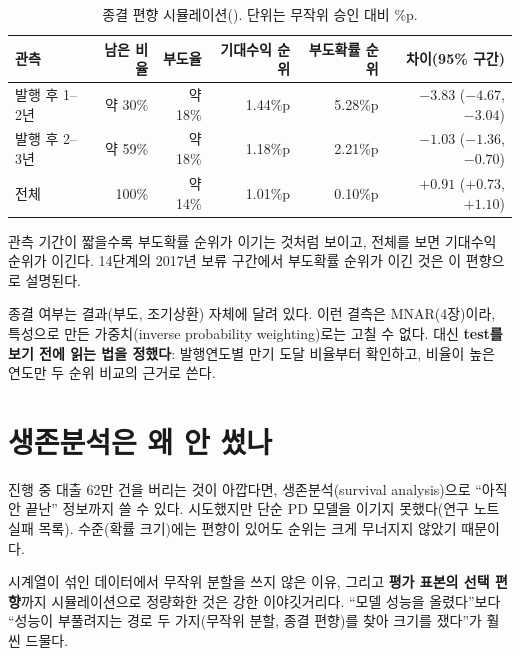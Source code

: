 \begin{table}[H]\centering\small
\begin{tabular}{@{}lrrrrr@{}}\toprule
관측 & 남은 비율 & 부도율 & 기대수익 순위 & 부도확률 순위 & 차이(95\% 구간)\\\midrule
발행 후 1--2년 & 약 30\% & 약 18\% & 1.44\%p & 5.28\%p & $-3.83$ ($-4.67$, $-3.04$)\\
발행 후 2--3년 & 약 59\% & 약 18\% & 1.18\%p & 2.21\%p & $-1.03$ ($-1.36$, $-0.70$)\\
전체 & 100\% & 약 14\% & 1.01\%p & 0.10\%p & $+0.91$ ($+0.73$, $+1.10$)\\\bottomrule
\end{tabular}
\caption{종결 편향 시뮬레이션(). 단위는 무작위 승인 대비 \%p.}
\end{table}

\begin{keybox}[결과 C23과 C6 정정]
관측 기간이 짧을수록 부도확률 순위가 이기는 것처럼 보이고, 전체를 보면 기대수익 순위가 이긴다. 14단계의 2017년 보류 구간에서 부도확률 순위가 이긴 것은 이 편향으로 설명된다.
\end{keybox}

\begin{warnbox}[고칠 수 있나]
종결 여부는 결과(부도, 조기상환) 자체에 달려 있다. 이런 결측은 MNAR(4장)이라, 특성으로 만든 가중치(inverse probability weighting)로는 고칠 수 없다. 대신 \textbf{test를 보기 전에 읽는 법을 정했다}: 발행연도별 만기 도달 비율부터 확인하고, 비율이 높은 연도만 두 순위 비교의 근거로 쓴다.
\end{warnbox}

\section{생존분석은 왜 안 썼나}
진행 중 대출 62만 건을 버리는 것이 아깝다면, 생존분석(survival analysis)으로 ``아직 안 끝난'' 정보까지 쓸 수 있다. 시도했지만 단순 PD 모델을 이기지 못했다(연구 노트 실패 목록). 수준(확률 크기)에는 편향이 있어도 순위는 크게 무너지지 않았기 때문이다.

\begin{career}
시계열이 섞인 데이터에서 무작위 분할을 쓰지 않은 이유, 그리고 \textbf{평가 표본의 선택 편향}까지 시뮬레이션으로 정량화한 것은 강한 이야깃거리다. ``모델 성능을 올렸다''보다 ``성능이 부풀려지는 경로 두 가지(무작위 분할, 종결 편향)를 찾아 크기를 쟀다''가 훨씬 드물다.
\end{career}
